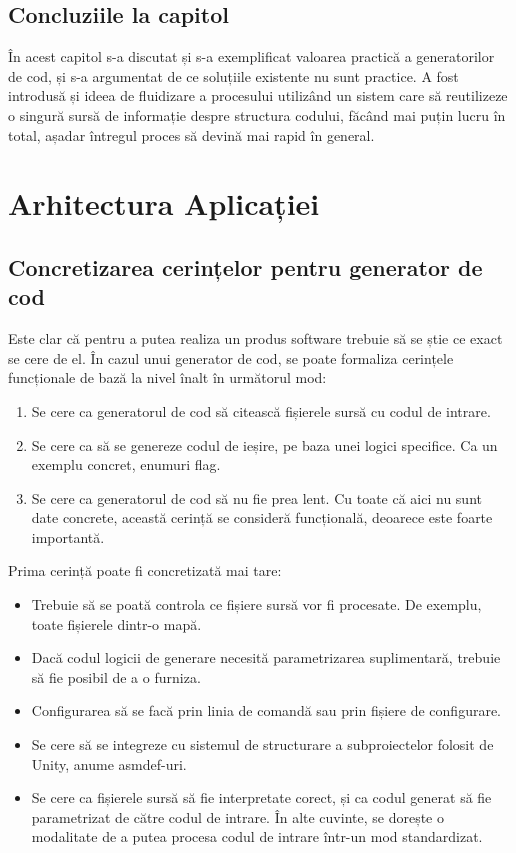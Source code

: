 \documentclass[a4paper,12pt]{report}
\def\oldchapter{} \let\oldchapter=\chapter{}
\def\chapter{\stepcounter{num_chapters}\oldchapter}
\newcommand\chapterConclusionSection[1]{\section{Concluziile la capitol \arabic{chapter}}}
\begin{document}
\chapterConclusionSection{intro_chapter_title}

În acest capitol s-a discutat și s-a exemplificat valoarea practică a generatorilor de cod, și s-a argumentat de ce soluțiile existente nu sunt practice.
A fost introdusă și ideea de fluidizare a procesului utilizând un sistem care să reutilizeze o singură sursă de informație despre structura codului, făcând mai puțin lucru în total, așadar întregul proces să devină mai rapid în general.

\chapter{Arhitectura Aplicației}\label{architecture_chapter_title}

\section{Concretizarea cerințelor pentru generator de cod}

Este clar că pentru a putea realiza un produs software trebuie să se știe ce exact se cere de el.
În cazul unui generator de cod, se poate formaliza cerințele funcționale de bază la nivel înalt în următorul mod:

\begin{enumerate}
  \item Se cere ca generatorul de cod să citească fișierele sursă cu codul de intrare.
  \item Se cere ca să se genereze codul de ieșire, pe baza unei logici specifice. Ca un exemplu concret, enumuri flag.
  \item Se cere ca generatorul de cod să nu fie prea lent.
        Cu toate că aici nu sunt date concrete, această cerință se consideră funcțională, deoarece este foarte importantă.
\end{enumerate}

Prima cerință poate fi concretizată mai tare:

\begin{itemize}
  \item Trebuie să se poată controla ce fișiere sursă vor fi procesate. De exemplu, toate fișierele dintr-o mapă.
  \item Dacă codul logicii de generare necesită parametrizarea suplimentară, trebuie să fie posibil de a o furniza.
  \item Configurarea să se facă prin linia de comandă sau prin fișiere de configurare.
  \item Se cere să se integreze cu sistemul de structurare a subproiectelor folosit de Unity, anume asmdef-uri.
  \item Se cere ca fișierele sursă să fie interpretate corect, și ca codul generat să fie parametrizat de către codul de intrare. În alte cuvinte, se dorește o modalitate de a putea procesa codul de intrare într-un mod standardizat.
\end{itemize}
\end{document}
